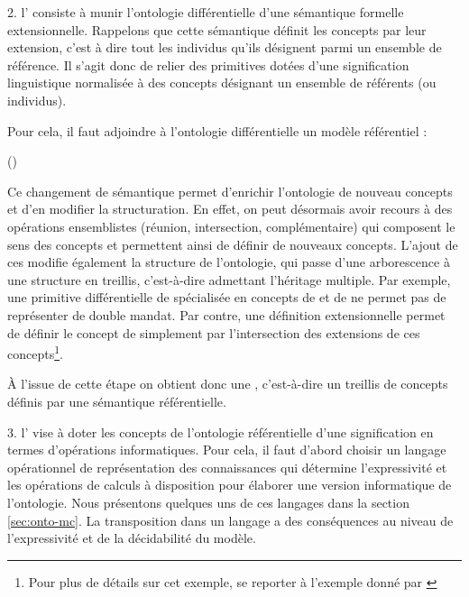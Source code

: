 \begin{liste}
	\item[2.] l' consiste à munir l'ontologie différentielle d'une sémantique formelle extensionnelle.
	Rappelons que cette sémantique définit les concepts par leur extension, c'est à dire tout les individus qu'ils désignent parmi un ensemble de référence. 
	Il s'agit donc de relier des primitives dotées d'une signification linguistique normalisée à des concepts désignant un ensemble de référents (ou individus).
	
	Pour cela, il faut adjoindre à l'ontologie différentielle un modèle référentiel : 

	 (\cite[p.148]{bachimont:icc})

	Ce changement de sémantique permet d'enrichir l'ontologie de nouveau concepts et d'en modifier la structuration. 
	En effet, on peut désormais avoir recours à des opérations ensemblistes (réunion, intersection, complémentaire) qui composent le sens des concepts et permettent ainsi de définir de nouveaux concepts.
	L'ajout de ces  modifie également la structure de l'ontologie, qui passe d'une arborescence à une structure en treillis, c'est-à-dire admettant l'héritage multiple. 
	Par exemple, une primitive différentielle de  spécialisée en concepts de  et de  ne permet pas de représenter de double mandat.
	Par contre, une définition extensionnelle permet de définir le concept de  simplement par l'intersection des extensions de ces concepts\footnote{Pour plus de détails sur cet exemple, se reporter à l'exemple donné par \cite[p.149]{bachimont:icc}}.\\
\end{liste}

	À l'issue de cette étape on obtient donc une , c'est-à-dire un treillis de concepts définis par une sémantique référentielle.\\

\begin{liste}
	\item[3.] l' vise à doter les concepts de l'ontologie référentielle d'une signification en termes d'opérations informatiques.
	Pour cela, il faut d'abord choisir un langage opérationnel de représentation des connaissances qui détermine l'expressivité et les opérations de calculs à disposition pour élaborer une version informatique de l'ontologie.
	Nous présentons quelques uns de ces langages dans la section \ref{sec:onto-mc}.
	La transposition dans un langage a des conséquences au niveau de l'expressivité et de la décidabilité du modèle. \\
\end{liste}

